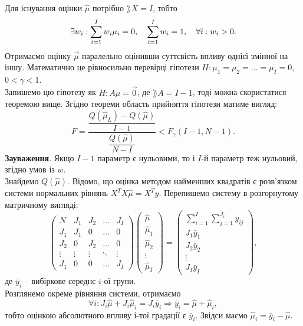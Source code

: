 Для існування оцінки $\widehat{\mu}$ потрібно $\rang  X = I$, тобто \[ \exists w_i: \displaystyle\sum\limits_{i=1}^I w_i\mu_i=0, \quad \displaystyle\sum\limits_{i=1}^I w_i = 1, \quad \forall i: w_i > 0. \]
Отримаємо оцінку $\vec \mu$ паралельно оцінивши суттєвість впливу однієї змінної на іншу. Математично це рівносильно перевірці гіпотези $H: \mu_1 = \mu_2 = \ldots = \mu_I = 0$, $0<\gamma<1$. \\

Запишемо цю гіпотезу як $H: A \mu = \vec 0$, де $\rang  A = I -1$, тоді можна скористатися теоремою вище. Згідно теореми область прийняття гіпотези матиме вигляд: \[ F = \dfrac{\dfrac{Q(\widehat{\mu}_L)-Q(\widehat{\mu})}{I-1}}{\dfrac{Q(\widehat{\mu})}{N-I}} < F_\gamma(I-1,N-1). \]
\textbf{Зауваження}. Якщо $I-1$ параметр є нульовими, то і $I$-й параметр теж нульовий, згідно умов із $w$. \\

Знайдемо $Q(\widehat{\mu})$. Відомо, що оцінка методом найменших квадратів є розв'язком системи нормальних рівнянь $X^T X \widehat{\mu} = X^T y$. Перепишемо систему в розгорнутому матричному вигляді:
\[ \begin{pmatrix} N & J_1 & J_2 & \ldots & J_{I} \\
 J_1 & J_1 & 0 & \ldots & 0 \\
 J_2 & 0 & J_2 & \ldots & 0 \\
 \vdots & \vdots & \vdots & \ddots & \vdots \\
 J_1 & 0 & 0 & \ldots & J_I \end{pmatrix} \begin{pmatrix} \widehat{\mu} \\
 \widehat{\mu}_1 \\
 \widehat{\mu}_2 \\
 \vdots \\
 \widehat{\mu}_I \end{pmatrix} = \begin{pmatrix} \sum_{i=1}^I\sum_{j=1}^{J_i}y_{ij} \\
 J_1 \bar{y}_1 \\
 J_2 \bar{y}_2 \\
 \vdots \\
 J_I \bar{y}_I \end{pmatrix}, \] де $\bar{y}_i$ -- вибіркове середнє $i$-ої групи.\\

Розглянемо окреме рівняння системи, отримаємо \[ \forall i: J_i \widehat{\mu} + J_i \widehat{\mu}_i = J_i \bar{y}_i \Rightarrow \bar{y}_i = \widehat{\mu} + \widehat{\mu}_i, \] тобто оцінкою абсолютного впливу $і$-тої градації є $\bar{y}_i$. Звідси маємо $\widehat{\mu}_i = \bar{y}_i - \widehat{\mu}$. \\

